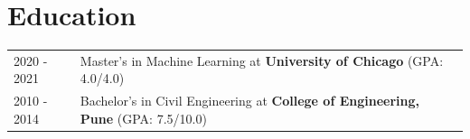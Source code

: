 \documentclass[a4paper,10pt]{article}
\begin{document}
\section{Education}
\begin{tabularx}{\linewidth}{@{}l X@{}}	
2020 - 2021 & Master's in Machine Learning at \textbf{University of Chicago} \hfill \normalsize (GPA: 4.0/4.0) \\

2010 - 2014 & Bachelor's in Civil Engineering at \textbf{College of Engineering, Pune} \hfill (GPA: 7.5/10.0) \\ 

\end{tabularx}


\end{document}
